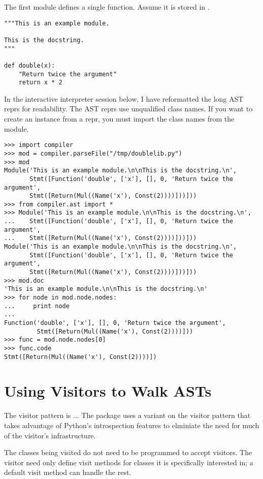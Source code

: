 The first module defines a single function.  Assume it is stored in
. 

\begin{verbatim}
"""This is an example module.

This is the docstring.
"""

def double(x):
    "Return twice the argument"
    return x * 2
\end{verbatim}

In the interactive interpreter session below, I have reformatted the
long AST reprs for readability.  The AST reprs use unqualified class
names.  If you want to create an instance from a repr, you must import
the class names from the  module.

\begin{verbatim}
>>> import compiler
>>> mod = compiler.parseFile("/tmp/doublelib.py")
>>> mod
Module('This is an example module.\n\nThis is the docstring.\n', 
       Stmt([Function('double', ['x'], [], 0, 'Return twice the argument', 
       Stmt([Return(Mul((Name('x'), Const(2))))]))]))
>>> from compiler.ast import *
>>> Module('This is an example module.\n\nThis is the docstring.\n', 
...    Stmt([Function('double', ['x'], [], 0, 'Return twice the argument', 
...    Stmt([Return(Mul((Name('x'), Const(2))))]))]))
Module('This is an example module.\n\nThis is the docstring.\n', 
       Stmt([Function('double', ['x'], [], 0, 'Return twice the argument', 
       Stmt([Return(Mul((Name('x'), Const(2))))]))]))
>>> mod.doc
'This is an example module.\n\nThis is the docstring.\n'
>>> for node in mod.node.nodes:
...     print node
... 
Function('double', ['x'], [], 0, 'Return twice the argument',
         Stmt([Return(Mul((Name('x'), Const(2))))]))
>>> func = mod.node.nodes[0]
>>> func.code
Stmt([Return(Mul((Name('x'), Const(2))))])
\end{verbatim}

\section{Using Visitors to Walk ASTs}


The visitor pattern is ...  The  package uses a
variant on the visitor pattern that takes advantage of Python's
introspection features to elminiate the need for much of the visitor's
infrastructure.

The classes being visited do not need to be programmed to accept
visitors.  The visitor need only define visit methods for classes it
is specifically interested in; a default visit method can handle the
rest. 

